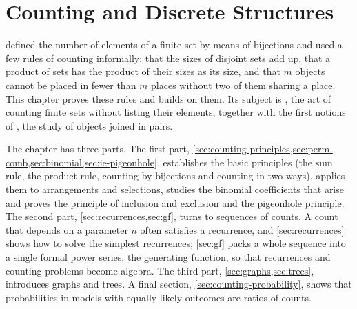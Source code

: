 \chapter{Counting and Discrete Structures}
\label{ch:counting}


 defined the number of elements of a finite set by means of bijections and used a few rules of counting informally: that the sizes of disjoint sets add up, that a product of sets has the product of their sizes as its size, and that $m$ objects cannot be placed in fewer than $m$ places without two of them sharing a place. This chapter proves these rules and builds on them. Its subject is , the art of counting finite sets without listing their elements, together with the first notions of , the study of objects joined in pairs.

The chapter has three parts. The first part, \cref{sec:counting-principles,sec:perm-comb,sec:binomial,sec:ie-pigeonhole}, establishes the basic principles (the sum rule, the product rule, counting by bijections and counting in two ways), applies them to arrangements and selections, studies the binomial coefficients that arise and proves the principle of inclusion and exclusion and the pigeonhole principle. The second part, \cref{sec:recurrences,sec:gf}, turns to sequences of counts. A count that depends on a parameter $n$ often satisfies a recurrence, and \cref{sec:recurrences} shows how to solve the simplest recurrences; \cref{sec:gf} packs a whole sequence into a single formal power series, the generating function, so that recurrences and counting problems become algebra. The third part, \cref{sec:graphs,sec:trees}, introduces graphs and trees. A final section, \cref{sec:counting-probability}, shows that probabilities in models with equally likely outcomes are ratios of counts.

